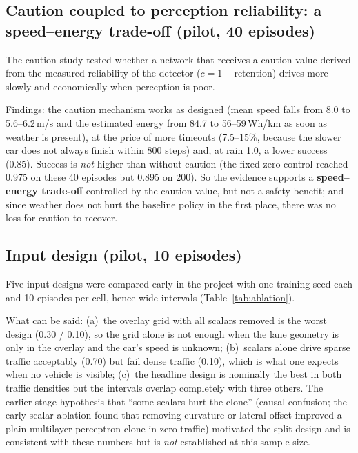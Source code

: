 \subsection{Caution coupled to perception reliability: a speed--energy trade-off (pilot, 40 episodes)}
The caution study tested whether a network that receives a caution value derived from the measured reliability of the detector ($c=1-\text{retention}$) drives more slowly and economically when perception is poor.
\begin{table}[H]\centering\small
\caption{Caution study, sparse traffic, seeds 1010--1049 (40 episodes per cell, pilot).}\label{tab:caution}
\resizebox{\textwidth}{!}{}
\end{table}
Findings: the caution mechanism works as designed (mean speed falls from 8.0 to 5.6--6.2\,m/s and the estimated energy from 84.7 to 56--59\,Wh/km as soon as weather is present), at the price of more timeouts (7.5--15\%, because the slower car does not always finish within 800 steps) and, at rain 1.0, a lower success (0.85).
Success is \emph{not} higher than without caution (the fixed-zero control reached 0.975 on these 40 episodes but 0.895 on 200). So the evidence supports a \textbf{speed--energy trade-off} controlled by the caution value, but not a safety benefit; and since weather does not hurt the baseline policy in the first place, there was no loss for caution to recover.

\subsection{Input design (pilot, 10 episodes)}
Five input designs were compared early in the project with one training seed each and 10 episodes per cell, hence wide intervals (Table~\ref{tab:ablation}).
\begin{table}[H]\centering\small
\caption{Input-design ablation, seeds 1000--1009 (10 episodes per cell). Intervals are 95\% Wilson intervals and are very wide.}\label{tab:ablation}
\resizebox{\textwidth}{!}{}
\end{table}
What can be said: (a)~the overlay grid with all scalars removed is the worst design (0.30 / 0.10), so the grid alone is not enough when the lane geometry is only in the overlay and the car's speed is unknown;
(b)~scalars alone drive sparse traffic acceptably (0.70) but fail dense traffic (0.10), which is what one expects when no vehicle is visible; (c)~the headline design is nominally the best in both traffic densities but the intervals overlap completely with three others.
The earlier-stage hypothesis that ``some scalars hurt the clone'' (causal confusion; the early scalar ablation found that removing curvature or lateral offset improved a plain multilayer-perceptron clone in zero traffic) motivated the split design and is consistent with these numbers but is \emph{not} established at this sample size.

